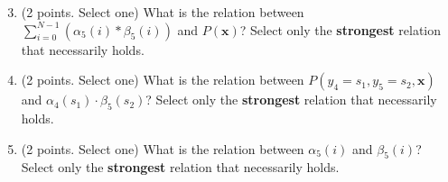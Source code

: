 \documentclass{article}
\newcommand{\xv}{\mathbf{x}}
\begin{document}
\begin{enumerate}
\setcounter{enumi}{2}
\item (2 points. Select one) What is the relation between $\sum_{i=0}^{N-1}(\alpha_5(i)*\beta_5(i))$ and $P(\xv)$? Select only the \textbf{strongest} relation that necessarily holds.

\item(2 points. Select one) What is the relation between $P(y_4=s_1, y_5=s_2, \xv)$ and $\alpha_4(s_1) \cdot \beta_5(s_2)$? Select only the \textbf{strongest} relation that necessarily holds.

\item (2 points. Select one) What is the relation between $\alpha_5(i)$ and $\beta_5(i)$? Select only the \textbf{strongest} relation that necessarily holds.

\end{enumerate}
\end{document}

